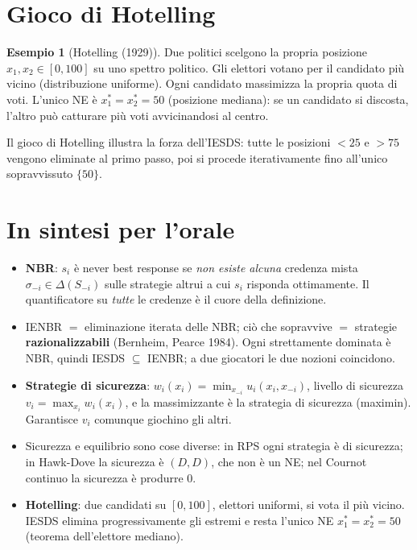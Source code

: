 \documentclass[12pt,a4paper,twoside]{book}
\theoremstyle{plain}
\theoremstyle{definition}
\newtheorem{example}[theorem]{Esempio}
\begin{document}
\section{Gioco di Hotelling}

\begin{example}[Hotelling (1929)]
Due politici scelgono la propria posizione $x_1,x_2\in[0,100]$ su uno spettro politico. Gli elettori votano per il candidato più vicino (distribuzione uniforme). Ogni candidato massimizza la propria quota di voti. L'unico NE è $x_1^*=x_2^*=50$ (posizione mediana): se un candidato si discosta, l'altro può catturare più voti avvicinandosi al centro.
\end{example}

Il gioco di Hotelling illustra la forza dell'IESDS: tutte le posizioni $<25$ e $>75$ vengono eliminate al primo passo, poi si procede iterativamente fino all'unico sopravvissuto $\{50\}$.

\section*{In sintesi per l'orale}
\begin{itemize}
  \item \textbf{NBR}: $s_i$ è never best response se \emph{non esiste alcuna} credenza mista $\sigma_{-i}\in\Delta(S_{-i})$ sulle strategie altrui a cui $s_i$ risponda ottimamente. Il quantificatore su \emph{tutte} le credenze è il cuore della definizione.
  \item IENBR $=$ eliminazione iterata delle NBR; ciò che sopravvive $=$ strategie \textbf{razionalizzabili} (Bernheim, Pearce 1984). Ogni strettamente dominata è NBR, quindi IESDS $\subseteq$ IENBR; a due giocatori le due nozioni coincidono.
  \item \textbf{Strategie di sicurezza}: $w_i(x_i)=\min_{x_{-i}}u_i(x_i,x_{-i})$, livello di sicurezza $v_i=\max_{x_i}w_i(x_i)$, e la massimizzante è la strategia di sicurezza (maximin). Garantisce $v_i$ comunque giochino gli altri.
  \item Sicurezza e equilibrio sono cose diverse: in RPS ogni strategia è di sicurezza; in Hawk-Dove la sicurezza è $(D,D)$, che non è un NE; nel Cournot continuo la sicurezza è produrre $0$.
  \item \textbf{Hotelling}: due candidati su $[0,100]$, elettori uniformi, si vota il più vicino. IESDS elimina progressivamente gli estremi e resta l'unico NE $x_1^*=x_2^*=50$ (teorema dell'elettore mediano).
\end{itemize}
\end{document}
